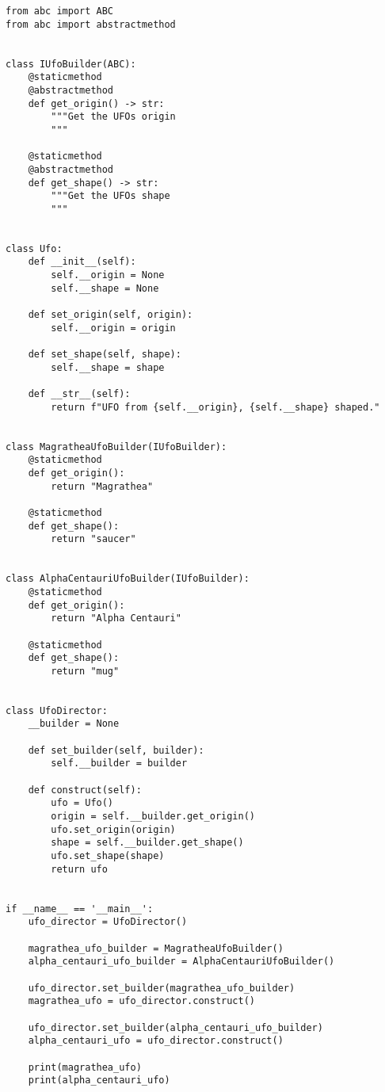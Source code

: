 \documentclass{article}
\begin{document}
  \begin{lstlisting}
from abc import ABC
from abc import abstractmethod


class IUfoBuilder(ABC):
    @staticmethod
    @abstractmethod
    def get_origin() -> str:
        """Get the UFOs origin
        """

    @staticmethod
    @abstractmethod
    def get_shape() -> str:
        """Get the UFOs shape
        """


class Ufo:
    def __init__(self):
        self.__origin = None
        self.__shape = None

    def set_origin(self, origin):
        self.__origin = origin

    def set_shape(self, shape):
        self.__shape = shape

    def __str__(self):
        return f"UFO from {self.__origin}, {self.__shape} shaped."


class MagratheaUfoBuilder(IUfoBuilder):
    @staticmethod
    def get_origin():
        return "Magrathea"

    @staticmethod
    def get_shape():
        return "saucer"


class AlphaCentauriUfoBuilder(IUfoBuilder):
    @staticmethod
    def get_origin():
        return "Alpha Centauri"

    @staticmethod
    def get_shape():
        return "mug"


class UfoDirector:
    __builder = None

    def set_builder(self, builder):
        self.__builder = builder

    def construct(self):
        ufo = Ufo()
        origin = self.__builder.get_origin()
        ufo.set_origin(origin)
        shape = self.__builder.get_shape()
        ufo.set_shape(shape)
        return ufo


if __name__ == '__main__':
    ufo_director = UfoDirector()

    magrathea_ufo_builder = MagratheaUfoBuilder()
    alpha_centauri_ufo_builder = AlphaCentauriUfoBuilder()

    ufo_director.set_builder(magrathea_ufo_builder)
    magrathea_ufo = ufo_director.construct()

    ufo_director.set_builder(alpha_centauri_ufo_builder)
    alpha_centauri_ufo = ufo_director.construct()

    print(magrathea_ufo)
    print(alpha_centauri_ufo)
  \end{lstlisting}
\end{document}
